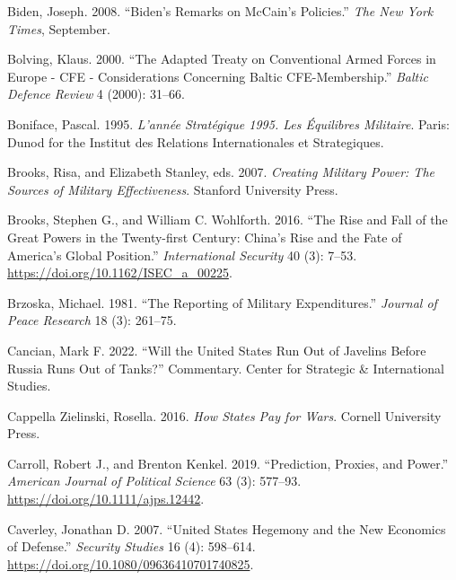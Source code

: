 \documentclass[
]{article}
\newlength{\cslhangindent}
\newlength{\cslentryspacingunit} %
\newenvironment{CSLReferences}[2] %
 {%
  \setlength{\parindent}{0pt}
  \ifodd #1
  \let\oldpar\par
  \def\par{\hangindent=\cslhangindent\oldpar}
  \fi
  \setlength{\parskip}{#2\cslentryspacingunit}
 }%
 {}
\begin{document}
\begin{CSLReferences}{1}{0}
\leavevmode{}%
Biden, Joseph. 2008. {``Biden's {Remarks} on {McCain}'s {Policies}.''} \emph{The New York Times}, September.

\leavevmode{}%
Bolving, Klaus. 2000. {``The {Adapted Treaty} on {Conventional Armed Forces} in {Europe} - {CFE} - {Considerations} Concerning {Baltic CFE-Membership}.''} \emph{Baltic Defence Review} 4 (2000): 31--66.

\leavevmode{}%
Boniface, Pascal. 1995. \emph{L'année {Stratégique} 1995. {Les} Équilibres Militaire}. {Paris}: {Dunod for the Institut des Relations Internationales et Strategiques}.

\leavevmode{}%
Brooks, Risa, and Elizabeth Stanley, eds. 2007. \emph{Creating {Military Power}: {The Sources} of {Military Effectiveness}}. {Stanford University Press}.

\leavevmode{}%
Brooks, Stephen G., and William C. Wohlforth. 2016. {``The {Rise} and {Fall} of the {Great Powers} in the {Twenty-first Century}: {China}'s {Rise} and the {Fate} of {America}'s {Global Position}.''} \emph{International Security} 40 (3): 7--53. \url{https://doi.org/10.1162/ISEC_a_00225}.

\leavevmode{}%
Brzoska, Michael. 1981. {``The Reporting of Military Expenditures.''} \emph{Journal of Peace Research} 18 (3): 261--75.

\leavevmode{}%
Cancian, Mark F. 2022. {``Will the {United States Run Out} of {Javelins Before Russia Runs Out} of {Tanks}?''} Commentary. {Center for Strategic \& International Studies}.

\leavevmode{}%
Cappella Zielinski, Rosella. 2016. \emph{How {States Pay} for {Wars}}. {Cornell University Press}.

\leavevmode{}%
Carroll, Robert J., and Brenton Kenkel. 2019. {``Prediction, {Proxies}, and {Power}.''} \emph{American Journal of Political Science} 63 (3): 577--93. \url{https://doi.org/10.1111/ajps.12442}.

\leavevmode{}%
Caverley, Jonathan D. 2007. {``United {States Hegemony} and the {New Economics} of {Defense}.''} \emph{Security Studies} 16 (4): 598--614. \url{https://doi.org/10.1080/09636410701740825}.


\end{CSLReferences}
\end{document}
